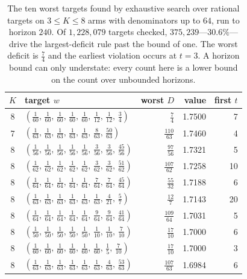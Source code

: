\begin{table}[htbp]
\caption{The ten worst targets found by exhaustive search over rational targets on
$3\le K\le8$ arms with denominators up to $64$, run to horizon $240$. Of $1,228,079$ targets
checked, $375,239$---$30.6\%$---drive the largest-deficit rule past the bound of one. The
worst deficit is $\frac{7}{4}$ and the earliest violation occurs at $t=3$. A horizon bound can
only understate: every count here is a lower bound on the count over unbounded
horizons. \NUM{}}
\label{tab:search}
\centering
\footnotesize
\setlength{\tabcolsep}{4pt}
\begin{tabular}{@{}clrrr@{}}
\toprule
$K$ & target $w$ & worst $D$ & value & first $t$ \\
\midrule
8 & $(\frac{1}{60},\,\frac{1}{60},\,\frac{1}{60},\,\frac{1}{60},\,\frac{1}{60},\,\frac{1}{12},\,\frac{1}{12},\,\frac{3}{4})$ & $\frac{7}{4}$ & 1.7500 & 7 \\
7 & $(\frac{1}{63},\,\frac{1}{63},\,\frac{1}{63},\,\frac{1}{63},\,\frac{1}{63},\,\frac{8}{63},\,\frac{50}{63})$ & $\frac{110}{63}$ & 1.7460 & 4 \\
8 & $(\frac{1}{56},\,\frac{1}{56},\,\frac{1}{56},\,\frac{1}{56},\,\frac{1}{56},\,\frac{3}{56},\,\frac{3}{56},\,\frac{45}{56})$ & $\frac{97}{56}$ & 1.7321 & 5 \\
8 & $(\frac{1}{62},\,\frac{1}{62},\,\frac{1}{62},\,\frac{1}{62},\,\frac{1}{62},\,\frac{3}{62},\,\frac{3}{62},\,\frac{51}{62})$ & $\frac{107}{62}$ & 1.7258 & 10 \\
8 & $(\frac{1}{64},\,\frac{1}{64},\,\frac{1}{64},\,\frac{1}{64},\,\frac{1}{64},\,\frac{7}{64},\,\frac{7}{64},\,\frac{45}{64})$ & $\frac{55}{32}$ & 1.7188 & 6 \\
8 & $(\frac{1}{63},\,\frac{1}{63},\,\frac{1}{63},\,\frac{1}{63},\,\frac{1}{63},\,\frac{1}{63},\,\frac{4}{21},\,\frac{5}{7})$ & $\frac{12}{7}$ & 1.7143 & 20 \\
8 & $(\frac{1}{64},\,\frac{1}{64},\,\frac{1}{64},\,\frac{1}{64},\,\frac{1}{64},\,\frac{9}{64},\,\frac{9}{64},\,\frac{41}{64})$ & $\frac{109}{64}$ & 1.7031 & 5 \\
8 & $(\frac{1}{50},\,\frac{1}{50},\,\frac{1}{50},\,\frac{1}{50},\,\frac{1}{50},\,\frac{1}{10},\,\frac{1}{10},\,\frac{7}{10})$ & $\frac{17}{10}$ & 1.7000 & 6 \\
8 & $(\frac{1}{60},\,\frac{1}{60},\,\frac{1}{60},\,\frac{1}{60},\,\frac{1}{60},\,\frac{1}{60},\,\frac{1}{5},\,\frac{7}{10})$ & $\frac{17}{10}$ & 1.7000 & 3 \\
8 & $(\frac{1}{63},\,\frac{1}{63},\,\frac{1}{63},\,\frac{1}{63},\,\frac{1}{63},\,\frac{1}{63},\,\frac{4}{63},\,\frac{53}{63})$ & $\frac{107}{63}$ & 1.6984 & 6 \\
\bottomrule
\end{tabular}


\end{table}
